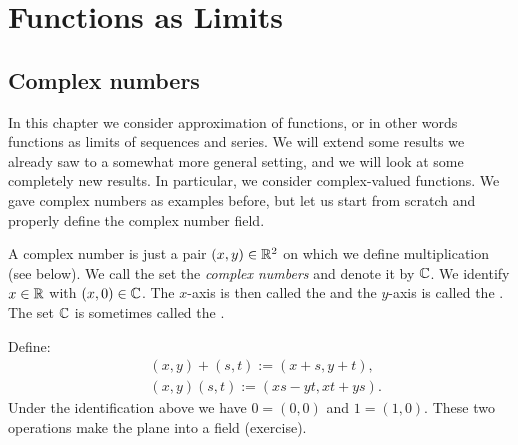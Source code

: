 
\chapter{Functions as Limits} \label{approx:chapter}


\section{Complex numbers}
\label{sec:complexnums}


In this chapter we consider approximation of functions, or in other words
functions as limits of sequences and series.
We will extend some results we already saw to a somewhat more
general setting, and we will look at some completely new results.
In particular, we consider complex-valued functions.
We gave complex numbers as examples before, but
let us start from scratch and properly define the complex number field.

A complex number is just a pair $(x,y) \in {\mathbb{R}}^2$ on which we define
multiplication (see below).
We call the set the \emph{complex numbers}
and denote it by ${\mathbb{C}}$.
We identify $x \in {\mathbb{R}}$ with $(x,0) \in {\mathbb{C}}$.
The $x$-axis is then called the \emph{} and the $y$-axis is
called the \emph{}.  The set ${\mathbb{C}}$ is sometimes called the
\emph{}.

Define:
\begin{align*}
& (x,y) + (s,t) := (x+s,y+t) , \\
& (x,y) (s,t) := (xs-yt,xt+ys) .
\end{align*}
Under the identification above we have $0 = (0,0)$ and $1 = (1,0)$.  These
two operations make the plane into a field (exercise).

